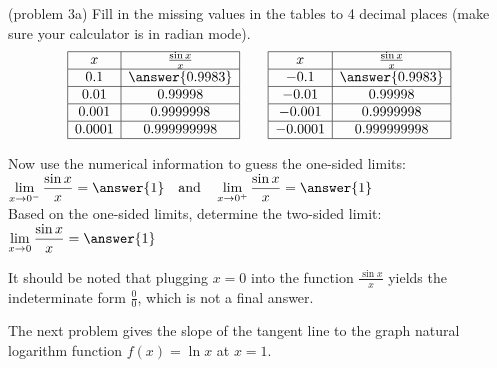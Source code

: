 \documentclass[handout]{ximera}
\begin{document}
\begin{problem}(problem 3a)
Fill in the missing values in the tables to 4 decimal places (make sure your calculator is in radian mode).
\[
\begin{array}{|c | c|}
	\hline
  x & \frac{\sin x}{x} \\ 
	\hline 
	0.1 & \answer{0.9983} \\ 
	\hline
	0.01 & 0.99998 \\ 
	\hline
	0.001 & 0.9999998 \\ 
	\hline
	0.0001 & 0.999999998\\
	\hline
\end{array}
\qquad
\begin{array}{|c | c|}
	\hline
  x & \frac{\sin x}{x} \\ 
	\hline 
	-0.1 & \answer{0.9983} \\ 
	\hline
	-0.01 & 0.99998 \\ 
	\hline
	-0.001 & 0.9999998 \\ 
	\hline
	-0.0001 & 0.999999998\\
	\hline
\end{array}
\]

Now use the numerical information to guess the one-sided limits:\\
$\displaystyle \lim_{x \to 0^-} \frac{\sin x}{x} = \answer{1} \quad \text{and} \quad \lim_{x \to 0^+} \frac{\sin x}{x} = \answer{1}$	\\

Based on the one-sided limits, determine the two-sided limit: $\displaystyle \lim_{x \to 0} \frac{\sin x}{x} = \answer{1}$

It should be noted that plugging $x=0$ into the 
function $\displaystyle{\frac{\sin x}{x}}$ yields the indeterminate form $\displaystyle\frac{0}{0}$, which is not a final answer.
\end{problem}

The next problem gives the slope of the tangent line to the graph natural logarithm function $f(x) = \ln x$ at $x=1$.
\end{document}

